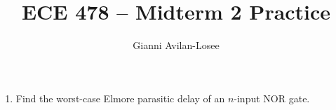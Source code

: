 \documentclass{article}
\title{ECE 478 -- Midterm 2 Practice}
\author{Gianni Avilan-Losee}
\begin{document}
\setcounter{section}{4}
\begin{enumerate}[label=\thesubsection]
	\setcounter{subsection}{4}
	\item Find the worst-case Elmore parasitic delay of an \(n\)-input NOR gate.


\end{enumerate}
\end{document}
